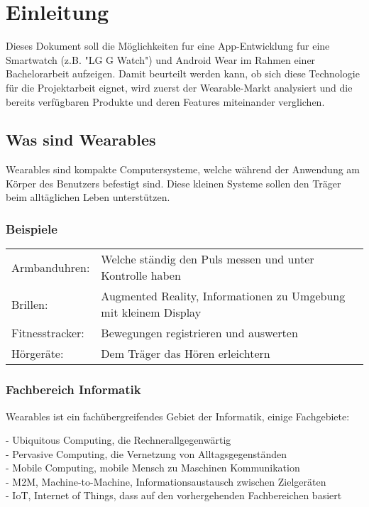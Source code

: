 \chapter{Einleitung}
\label{chap:teil1_einleitung}

Dieses Dokument soll die Möglichkeiten fur eine App-Entwicklung fur eine Smartwatch {(z.B. "LG G Watch")} und Android Wear im Rahmen einer Bachelorarbeit aufzeigen.
Damit beurteilt werden kann, ob sich diese Technologie für die Projektarbeit eignet, wird zuerst der Wearable-Markt analysiert und die bereits verfügbaren Produkte und deren Features miteinander verglichen.

\nocite{kopka:band1}
\nocite{raichle:bibtex_programmierung}
\nocite{MiKTeX}
\nocite{KOMA}
\nocite{TeXnicCenter}
\nocite{Marti06}
\nocite{Erbsland08}
\nocite{juergens:einfuehrung}
\nocite{juergens:fortgeschritten}

\section{Was sind Wearables}
\label{sec:teil1_was_sind_wearables}

Wearables sind kompakte Computersysteme, welche während der Anwendung am Körper des Benutzers befestigt sind.
Diese kleinen Systeme sollen den Träger beim alltäglichen Leben unterstützen.

\subsection{Beispiele}
\begin{tabular}{ll}
Armbanduhren: &	Welche ständig den Puls messen und unter Kontrolle haben \\
Brillen:	& Augmented Reality, Informationen zu Umgebung mit kleinem Display \\
Fitnesstracker: & Bewegungen registrieren und auswerten \\
Hörgeräte: & Dem Träger das Hören erleichtern
\end{tabular}

\subsection{Fachbereich Informatik}
Wearables ist ein fachübergreifendes Gebiet der Informatik, einige Fachgebiete:

- Ubiquitous Computing, die Rechnerallgegenwärtig \\
- Pervasive Computing, die Vernetzung von Alltagsgegenständen \\
- Mobile Computing, mobile Mensch zu Maschinen Kommunikation \\
- M2M, Machine-to-Machine, Informationsaustausch zwischen Zielgeräten \\
- IoT, Internet of Things, dass auf den vorhergehenden Fachbereichen basiert 

